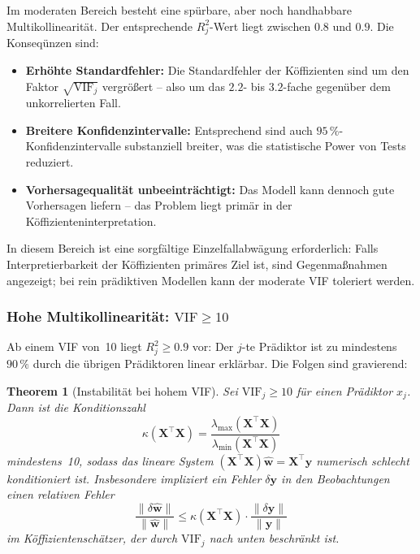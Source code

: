 ﻿\documentclass[12pt, a4paper]{article}
\newtheorem{theorem}{Theorem}[section]
\theoremstyle{definition}
\theoremstyle{remark}
\newcommand{\vw}{\bm{w}}
\newcommand{\vy}{\bm{y}}
\newcommand{\vX}{\bm{X}}
\newcommand{\T}{\top}
\begin{document}
Im moderaten Bereich besteht eine spürbare, aber noch handhabbare Multikollinearität.
Der entsprechende $R_j^2$-Wert liegt zwischen $0.8$ und $0.9$. Die Konseqünzen sind:
\begin{itemize}
	\item \textbf{Erhöhte Standardfehler:} Die Standardfehler der Köffizienten sind um den
	Faktor $\sqrt{\mathrm{VIF}_j}$ vergrößert -- also um das $2.2$- bis $3.2$-fache gegenüber
	dem unkorrelierten Fall.
	\item \textbf{Breitere Konfidenzintervalle:} Entsprechend sind auch $95\,\%$-Konfidenzintervalle
	substanziell breiter, was die statistische Power von Tests reduziert.
	\item \textbf{Vorhersagequalität unbeeinträchtigt:} Das Modell kann dennoch gute
	Vorhersagen liefern -- das Problem liegt primär in der Köffizienteninterpretation.
\end{itemize}
In diesem Bereich ist eine sorgfältige Einzelfallabwägung erforderlich: Falls Interpretierbarkeit
der Köffizienten primäres Ziel ist, sind Gegenmaßnahmen angezeigt; bei rein prädiktiven
Modellen kann der moderate VIF toleriert werden.

\subsubsection{Hohe Multikollinearität: $\mathrm{VIF} \geq 10$}

Ab einem VIF von~10 liegt $R_j^2 \geq 0.9$ vor: Der $j$-te Prädiktor ist zu mindestens $90\,\%$
durch die übrigen Prädiktoren linear erklärbar. Die Folgen sind gravierend:

\begin{theorem}[Instabilität bei hohem VIF]
	\label{thm:instability}
	Sei $\mathrm{VIF}_j \geq 10$ für einen Prädiktor $x_j$. Dann ist die Konditionszahl
	\[
	\kappa(\vX^\T\vX) = \frac{\lambda_{\max}(\vX^\T\vX)}{\lambda_{\min}(\vX^\T\vX)}
	\]
	mindestens~10, sodass das lineare System $(\vX^\T\vX)\hat{\vw} = \vX^\T\vy$ numerisch 
	schlecht konditioniert ist. Insbesondere impliziert ein Fehler $\delta\vy$ in den 
	Beobachtungen einen relativen Fehler
	\[
	\frac{\|\delta\hat{\vw}\|}{\|\hat{\vw}\|} \leq \kappa(\vX^\T\vX) \cdot \frac{\|\delta\vy\|}{\|\vy\|}
	\]
	im Köffizientenschätzer, der durch $\mathrm{VIF}_j$ nach unten beschränkt ist.
\end{theorem}
\end{document}
